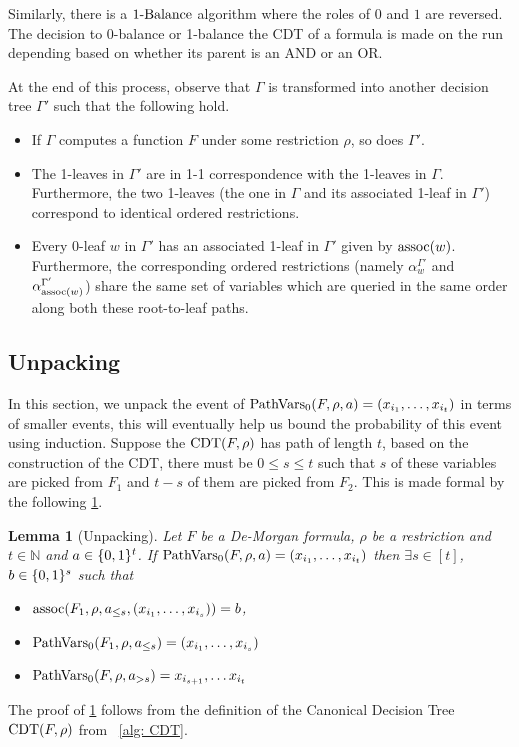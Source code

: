 \documentclass[11pt]{article}
\newtheorem{lemma}[theorem]{Lemma}
\begin{document}
Similarly, there is a $\operatorname{1-Balance}$ algorithm where the roles of $0$ and $1$ are reversed. The decision to 0-balance or 1-balance the CDT of a formula is made on the run depending based on whether its parent is an AND or an OR. 


At the end of this process, observe that $\Gamma$ is transformed into another decision tree $\Gamma'$ such that the following hold.
\begin{itemize}
    \item If $\Gamma$ computes a function $F$ under some restriction $\rho$, so does $\Gamma'$. 
    \item The 1-leaves in $\Gamma'$ are in 1-1 correspondence with the 1-leaves in $\Gamma$. Furthermore, the two 1-leaves (the one in $\Gamma$ and its associated 1-leaf in $\Gamma'$) correspond to identical ordered restrictions.
    \item Every 0-leaf $w$ in $\Gamma'$ has an associated 1-leaf in $\Gamma'$ given by $\operatorname{assoc}(w)$. Furthermore, the corresponding ordered restrictions (namely $\alpha^{\Gamma'}_w$ and $\alpha^{\Gamma'}_{\operatorname{assoc}(w)}$) share the same set of variables which are queried in the same order along both these root-to-leaf paths.
\end{itemize}

\subsection{Unpacking}

In this section, we unpack the event of $\mathrm{PathVars}_0(F,\rho,a) = (x_{i_1}, \dots ,x_{i_t})$ in terms of smaller events, this will eventually help us bound the probability of this event using induction.  
Suppose the $\operatorname{CDT}(F,\rho)$ has path of length $t$, based on the construction of the CDT, there must be $0 \le s \le t$ such that $s$ of these variables are picked from $F_1$ and $t-s$ of them are picked from $F_2$. This is made formal by the following \cref{lem: Unpacking}.

\begin{lemma}[Unpacking]
\label{lem: Unpacking}
    Let $F$ be a De-Morgan formula, $\rho$ be a restriction and $t \in \mathbb{N}$ and $a \in \{0,1\}^t$. If $\mathrm{PathVars}_0(F,\rho,a) = (x_{i_1}, \dots ,x_{i_t})$ then $\exists s \in [t]$, $b \in \{0,1\}^s$  such that
    \begin{itemize}
        \item $\operatorname{assoc}(F_1,\rho,a_{\leq s}, (x_{i_1},\dots , x_{i_s})) = b$,
        \item $\mathrm{PathVars}_0(F_1,\rho,a_{\le s}) = (x_{i_1}, \dots ,x_{i_s})$
        \item $\mathrm{PathVars}_0(F,\rho,a_{>s}) = x_{i_{s+1}}, \dots x_{i_t}$
    \end{itemize}
\end{lemma} %
The proof of \cref{lem: Unpacking} follows from the definition  of the Canonical Decision Tree $\operatorname{CDT}(F,\rho)$ from ~\cref{alg: CDT}.
\end{document}

